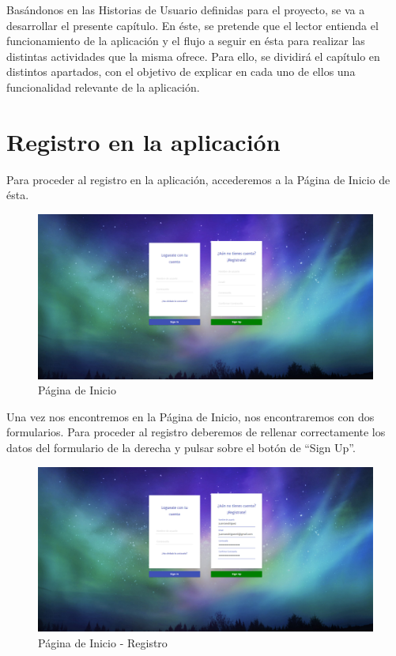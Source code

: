 \documentclass[11pt,openany]{book}
\begin{document}
Basándonos en las Historias de Usuario definidas para el proyecto, se va a desarrollar el presente capítulo. En éste, se pretende que el lector entienda el funcionamiento de la aplicación y el flujo a seguir en ésta para realizar las distintas actividades que la misma ofrece. Para ello, se dividirá el capítulo en distintos apartados, con el objetivo de explicar en cada uno de ellos una funcionalidad relevante de la aplicación.

\section{Registro en la aplicación}

Para proceder al registro en la aplicación, accederemos a la Página de Inicio de ésta.

\begin{figure}[H]
\centering
\includegraphics[totalheight=7cm]{manualUsuario/paginaInicio.png}
\caption{Página de Inicio}
\end{figure}

Una vez nos encontremos en la Página de Inicio, nos encontraremos con dos formularios. Para proceder al registro deberemos de rellenar correctamente los datos del formulario de la derecha y pulsar sobre el botón de ``Sign Up''. 

\begin{figure}[H]
\centering
\includegraphics[totalheight=7cm]{manualUsuario/registro.png}
\caption{Página de Inicio - Registro}
\end{figure}
\end{document}
